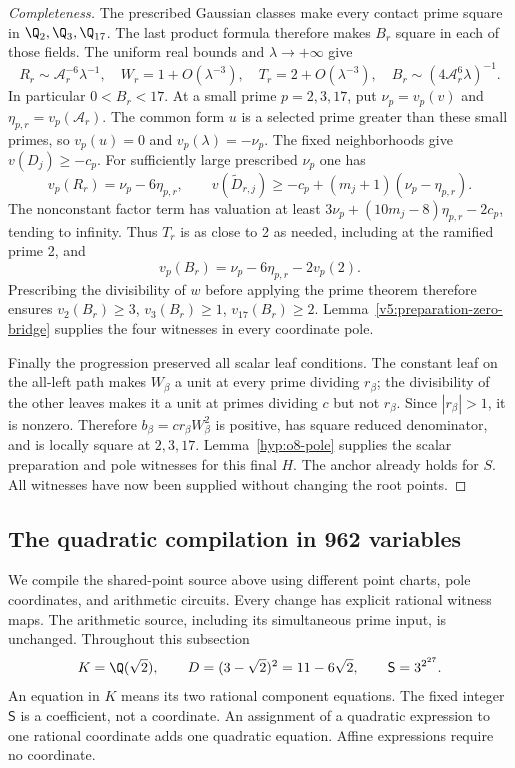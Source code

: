 \begin{proof}[Completeness]
The prescribed Gaussian classes make every contact prime square
in $\Q_2,\Q_3,\Q_{17}$. The last product formula therefore makes
$B_r$ square in each of those fields. The uniform real bounds
and $\lambda\longrightarrow+\infty$ give
\[
 R_r\sim\mathcal A_r^{-6}\lambda^{-1},\quad
 W_r=1+O(\lambda^{-3}),\quad T_r=2+O(\lambda^{-3}),\quad
 B_r\sim(4\mathcal A_r^6\lambda)^{-1}.
\]
In particular $0<B_r<17$. At a small prime $p=2,3,17$, put
$\nu_p=v_p(v)$ and $\eta_{p,r}=v_p(\mathcal A_r)$.
The common form $u$ is a selected prime greater than these small
primes, so $v_p(u)=0$ and $v_p(\lambda)=-\nu_p$.
The fixed neighborhoods give $v(D_j)\ge-c_p$. For sufficiently
large prescribed $\nu_p$ one has
\[
 v_p(R_r)=\nu_p-6\eta_{p,r},\qquad
 v(\widetilde D_{r,j})\ge-c_p+(m_j+1)(\nu_p-\eta_{p,r}).
\]
The nonconstant factor term has valuation at least
$3\nu_p+(10m_j-8)\eta_{p,r}-2c_p$, tending to infinity.
Thus $T_r$ is as close to 2 as needed, including at the ramified
prime 2, and
\[
 v_p(B_r)=\nu_p-6\eta_{p,r}-2v_p(2).
\]
Prescribing the divisibility of $w$ before applying the prime theorem
therefore ensures $v_2(B_r)\ge3$, $v_3(B_r)\ge1$,
$v_{17}(B_r)\ge2$. Lemma~\ref{v5:preparation-zero-bridge} supplies
the four witnesses in every coordinate pole.

Finally the progression preserved all scalar leaf conditions.
The constant leaf on the all-left path makes $W_\beta$ a unit at
every prime dividing $r_\beta$; the divisibility of the other
leaves makes it a unit at primes dividing $c$ but not $r_\beta$.
Since $|r_\beta|>1$, it is nonzero. Therefore
$b_\beta=cr_\beta W_\beta^2$ is positive, has square reduced
denominator, and is locally square at $2,3,17$.
Lemma~\ref{hyp:o8-pole} supplies the scalar preparation and pole
witnesses for this final $H$. The anchor already holds for $S$.
All witnesses have now been supplied without changing the root points.
\end{proof}

\subsection{The quadratic compilation in 962 variables}
\label{subsec:v6-962-compilation}

We compile the shared-point source above using different point charts,
pole coordinates, and arithmetic circuits. Every change has explicit
rational witness maps. The arithmetic source, including its simultaneous
prime input, is unchanged. Throughout this subsection
\[
 K=\Q(\sqrt2),\qquad D=(3-\sqrt2)^2=11-6\sqrt2,
 \qquad \mathsf S=3^{2^{27}}.
\]
An equation in $K$ means its two rational component equations. The fixed
integer $\mathsf S$ is a coefficient, not a coordinate. An assignment of
a quadratic expression to one rational coordinate adds one quadratic
equation. Affine expressions require no coordinate.

